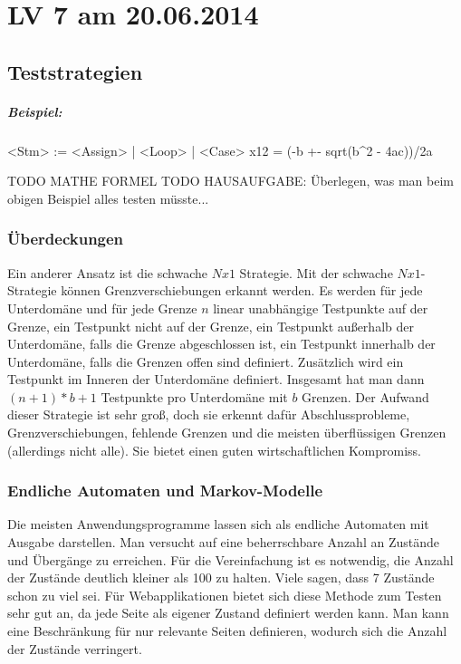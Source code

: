 \chapter{LV 7 am 20.06.2014}
\section{Teststrategien}
\paragraph{Beispiel:}

<Stm> := <Assign> | <Loop> | <Case>
x12 = (-b +- sqrt(b^2 - 4ac))/2a

TODO MATHE FORMEL
TODO HAUSAUFGABE: Überlegen, was man beim obigen Beispiel alles testen müsste...


\subsection{Überdeckungen}
Ein anderer Ansatz ist die schwache $Nx1$ Strategie. Mit der schwache $Nx1$-Strategie können Grenzverschiebungen erkannt werden. Es werden für jede Unterdomäne und für jede Grenze $n$ linear unabhängige Testpunkte auf der Grenze, ein Testpunkt nicht auf der Grenze, ein Testpunkt außerhalb der Unterdomäne, falls die Grenze abgeschlossen ist, ein Testpunkt innerhalb der Unterdomäne, falls die Grenzen offen sind definiert. Zusätzlich wird ein Testpunkt im Inneren der Unterdomäne definiert. Insgesamt hat man dann $(n+1)*b+1$ Testpunkte pro Unterdomäne mit $b$ Grenzen. Der Aufwand dieser Strategie ist sehr groß, doch sie erkennt dafür Abschlussprobleme, Grenzverschiebungen, fehlende Grenzen und die meisten überflüssigen Grenzen (allerdings nicht alle). Sie bietet einen guten wirtschaftlichen Kompromiss. 

\subsection{Endliche Automaten und Markov-Modelle}
Die meisten Anwendungsprogramme lassen sich als endliche Automaten mit Ausgabe darstellen. Man versucht auf eine beherrschbare Anzahl an Zustände und Übergänge zu erreichen. Für die Vereinfachung ist es notwendig, die Anzahl der Zustände deutlich kleiner als 100 zu halten. Viele sagen, dass 7 Zustände schon zu viel sei. Für Webapplikationen bietet sich diese Methode zum Testen sehr gut an, da jede Seite als eigener Zustand definiert werden kann. Man kann eine Beschränkung für nur relevante Seiten definieren, wodurch sich die Anzahl der Zustände verringert. 

